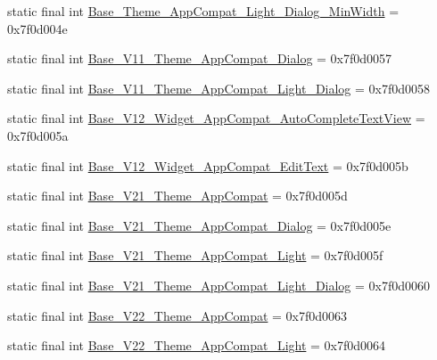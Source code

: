 \begin{DoxyCompactItemize}
\item 
static final int \mbox{\hyperlink{classcom_1_1google_1_1android_1_1gms_1_1R_1_1style_a887419ad022eeface3dd7b93f06bcbbe}{Base\+\_\+\+Theme\+\_\+\+App\+Compat\+\_\+\+Light\+\_\+\+Dialog\+\_\+\+Min\+Width}} = 0x7f0d004e
\item 
static final int \mbox{\hyperlink{classcom_1_1google_1_1android_1_1gms_1_1R_1_1style_aa7c1264d23350a3ccc60ed21931a4cd6}{Base\+\_\+\+V11\+\_\+\+Theme\+\_\+\+App\+Compat\+\_\+\+Dialog}} = 0x7f0d0057
\item 
static final int \mbox{\hyperlink{classcom_1_1google_1_1android_1_1gms_1_1R_1_1style_a460c59fed2bcfed9e4113fbe3697dc73}{Base\+\_\+\+V11\+\_\+\+Theme\+\_\+\+App\+Compat\+\_\+\+Light\+\_\+\+Dialog}} = 0x7f0d0058
\item 
static final int \mbox{\hyperlink{classcom_1_1google_1_1android_1_1gms_1_1R_1_1style_a23cae628b98e43a058333e7e25a1d49d}{Base\+\_\+\+V12\+\_\+\+Widget\+\_\+\+App\+Compat\+\_\+\+Auto\+Complete\+Text\+View}} = 0x7f0d005a
\item 
static final int \mbox{\hyperlink{classcom_1_1google_1_1android_1_1gms_1_1R_1_1style_a93d85e245edc46268120f40206998a03}{Base\+\_\+\+V12\+\_\+\+Widget\+\_\+\+App\+Compat\+\_\+\+Edit\+Text}} = 0x7f0d005b
\item 
static final int \mbox{\hyperlink{classcom_1_1google_1_1android_1_1gms_1_1R_1_1style_ae465f5ed5dc1d010a8176a008ce31771}{Base\+\_\+\+V21\+\_\+\+Theme\+\_\+\+App\+Compat}} = 0x7f0d005d
\item 
static final int \mbox{\hyperlink{classcom_1_1google_1_1android_1_1gms_1_1R_1_1style_ad50d16e6ec5ae346f9c9f6b16b9482d0}{Base\+\_\+\+V21\+\_\+\+Theme\+\_\+\+App\+Compat\+\_\+\+Dialog}} = 0x7f0d005e
\item 
static final int \mbox{\hyperlink{classcom_1_1google_1_1android_1_1gms_1_1R_1_1style_a402041b09d1245e2945648273933d9c5}{Base\+\_\+\+V21\+\_\+\+Theme\+\_\+\+App\+Compat\+\_\+\+Light}} = 0x7f0d005f
\item 
static final int \mbox{\hyperlink{classcom_1_1google_1_1android_1_1gms_1_1R_1_1style_a4bd3c6841a4ca8c107331434c4957bbd}{Base\+\_\+\+V21\+\_\+\+Theme\+\_\+\+App\+Compat\+\_\+\+Light\+\_\+\+Dialog}} = 0x7f0d0060
\item 
static final int \mbox{\hyperlink{classcom_1_1google_1_1android_1_1gms_1_1R_1_1style_ae07ed0c0e7bd7314bd342f02162b7528}{Base\+\_\+\+V22\+\_\+\+Theme\+\_\+\+App\+Compat}} = 0x7f0d0063
\item 
static final int \mbox{\hyperlink{classcom_1_1google_1_1android_1_1gms_1_1R_1_1style_afca19f7fff6043e9a4b4dd387ef9dcf5}{Base\+\_\+\+V22\+\_\+\+Theme\+\_\+\+App\+Compat\+\_\+\+Light}} = 0x7f0d0064

\end{DoxyCompactItemize}
